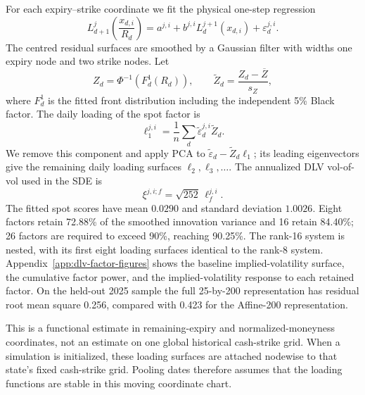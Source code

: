\documentclass[11pt]{article}
\theoremstyle{plain}
\theoremstyle{definition}
\theoremstyle{remark}
\begin{document}
For each expiry--strike coordinate we fit the physical one-step regression
\begin{equation}
  \label{eq:estimation-dlv-ar}
  L_{d+1}^{j}\!\left(\frac{x_{d,i}}{R_d}\right)
  =a^{j,i}+b^{j,i}L_d^{j+1}(x_{d,i})+\varepsilon_d^{j,i}.
\end{equation}
The centred residual surfaces are smoothed by a Gaussian filter with widths
one expiry node and two strike nodes.  Let
\[
  Z_d=\Phi^{-1}\!\left(F_d^1(R_d)\right),
  \qquad
  \widetilde Z_d=\frac{Z_d-\overline Z}{s_Z},
\]
where $F_d^1$ is the fitted front distribution including the independent 5\%
Black factor.  The daily loading of the spot factor is
\[
  \ell_1^{j,i}=\frac1n\sum_d
    \widetilde\varepsilon_d^{j,i}\widetilde Z_d.
\]
We remove this component and apply PCA to
$\widetilde\varepsilon_d-\widetilde Z_d\ell_1$; its leading eigenvectors give
the remaining daily loading surfaces $\ell_2,\ell_3,\ldots$.  The annualized
DLV vol-of-vol used in the SDE is
\begin{equation}
  \label{eq:estimation-annualized-xi}
  \xi^{j,i;f}=\sqrt{252}\,\ell_f^{j,i}.
\end{equation}
The fitted spot scores have mean $0.0290$ and standard deviation $1.0026$.
Eight factors retain 72.88\% of the smoothed innovation variance and 16 retain
84.40\%; 26 factors are required to exceed 90\%, reaching 90.25\%.  The
rank-16 system is nested, with its first eight loading surfaces identical to
the rank-8 system.  Appendix~\ref{app:dlv-factor-figures} shows the baseline
implied-volatility surface, the cumulative factor power, and the implied-volatility
response to each retained factor.  On the held-out 2025 sample the
full 25-by-200 representation has residual root mean square 0.256, compared
with 0.423 for the Affine-200 representation.

This is a functional estimate in remaining-expiry and normalized-moneyness
coordinates, not an estimate on one global historical cash-strike grid.  When
a simulation is initialized, these loading surfaces are attached nodewise to
that state's fixed cash-strike grid.  Pooling dates therefore assumes that the
loading functions are stable in this moving coordinate chart.
\end{document}
